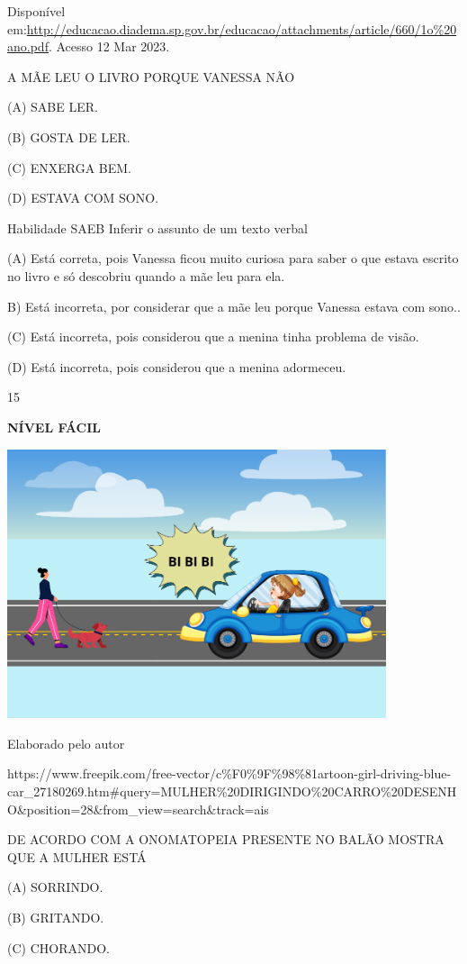 {{Disponível
em:\url{http://educacao.diadema.sp.gov.br/educacao/attachments/article/660/1o\%20ano.pdf}.
Acesso 12 Mar 2023.

A MÃE LEU O LIVRO PORQUE VANESSA NÃO

(A) SABE LER.

(B) GOSTA DE LER.

(C) ENXERGA BEM.

(D) ESTAVA COM SONO.

Habilidade SAEB Inferir o assunto de um texto verbal

(A) Está correta, pois Vanessa ficou muito curiosa para saber o que
estava escrito no livro e só descobriu quando a mãe leu para ela.

B) Está incorreta, por considerar que a mãe leu porque Vanessa estava
com sono..

(C) Está incorreta, pois considerou que a menina tinha problema de
visão.

(D) Está incorreta, pois considerou que a menina adormeceu.

\num{15}

\textbf{NÍVEL FÁCIL}

\includegraphics[width=4.38462in,height=3.11119in]{media/image182.png}

Elaborado pelo autor

https://www.freepik.com/free-vector/c\%F0\%9F\%98\%81artoon-girl-driving-blue-car\_27180269.htm\#query=MULHER\%20DIRIGINDO\%20CARRO\%20DESENHO\&position=28\&from\_view=search\&track=ais

DE ACORDO COM A ONOMATOPEIA PRESENTE NO BALÃO MOSTRA QUE A MULHER ESTÁ

(A) SORRINDO.

(B) GRITANDO.

(C) CHORANDO.

}}

